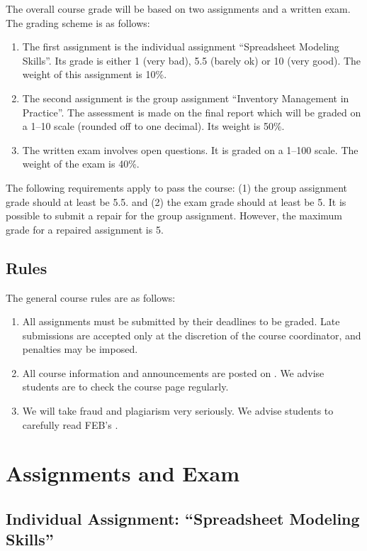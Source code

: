 \documentclass{article}
\begin{document}
The overall course grade will be based on two assignments and a written exam. The grading scheme is as follows: 
\begin{enumerate}
\item The first assignment is the individual assignment ``Spreadsheet Modeling Skills''. Its grade is either 1 (very bad), 5.5 (barely ok) or 10 (very good). The weight of this assignment is 10\%.
\item The second assignment is the group assignment ``Inventory Management in Practice''. The assessment is made on the final report which will be graded on a 1--10 scale (rounded off to one decimal). Its weight is 50\%. 
\item The written exam involves open questions. It is graded on a 1--100 scale. The weight of the exam is 40\%. 
\end{enumerate}

The following requirements apply to pass the course: (1) the group assignment grade should at least be 5.5. and (2) the exam grade should at least be 5. It is possible to submit a repair for the group assignment. However, the maximum grade for a repaired assignment is 5.

\subsection{Rules}

The general course rules are as follows:
\begin{enumerate}
\item All assignments must be submitted by their deadlines to be graded. Late submissions are accepted only at the discretion of the course coordinator, and penalties may be imposed. 
\item All course information and announcements are posted on \nestor. We advise students are to check the course page regularly.
\item We will take fraud and plagiarism very seriously. We advise students to carefully read FEB's \policy.
\end{enumerate}

 
\section{Assignments and Exam}

\subsection{Individual Assignment: ``Spreadsheet Modeling Skills''}
\label{sec:individual}
\end{document}
